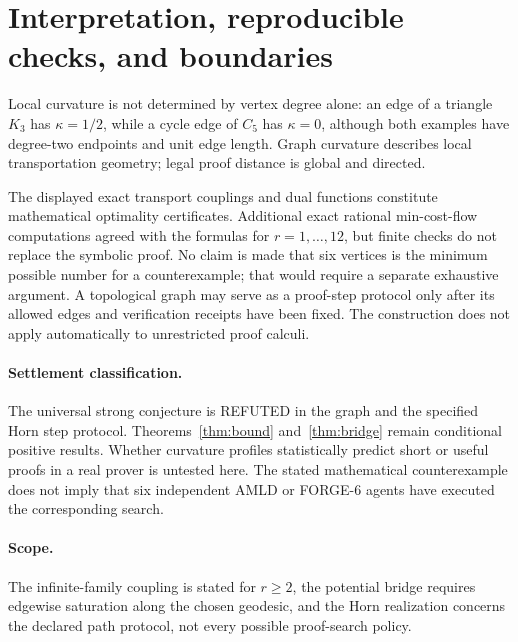 \section{Interpretation, reproducible checks, and boundaries}
Local curvature is not determined by vertex degree alone: an edge of a triangle $K_3$ has $\kappa=1/2$, while a cycle edge of $C_5$ has $\kappa=0$, although both examples have degree-two endpoints and unit edge length. Graph curvature describes local transportation geometry; legal proof distance is global and directed.

The displayed exact transport couplings and dual functions constitute mathematical optimality certificates. Additional exact rational min-cost-flow computations agreed with the formulas for $r=1,\dots,12$, but finite checks do not replace the symbolic proof. No claim is made that six vertices is the minimum possible number for a counterexample; that would require a separate exhaustive argument. A topological graph may serve as a proof-step protocol only after its allowed edges and verification receipts have been fixed. The construction does not apply automatically to unrestricted proof calculi.

\paragraph{Settlement classification.} The universal strong conjecture is \textsf{REFUTED} in the graph and the specified Horn step protocol. Theorems~\ref{thm:bound} and~\ref{thm:bridge} remain conditional positive results. Whether curvature profiles statistically predict short or useful proofs in a real prover is untested here. The stated mathematical counterexample does not imply that six independent AMLD or FORGE-6 agents have executed the corresponding search.

\paragraph{Scope.} The infinite-family coupling is stated for $r\ge2$, the potential bridge requires edgewise saturation along the chosen geodesic, and the Horn realization concerns the declared path protocol, not every possible proof-search policy.

